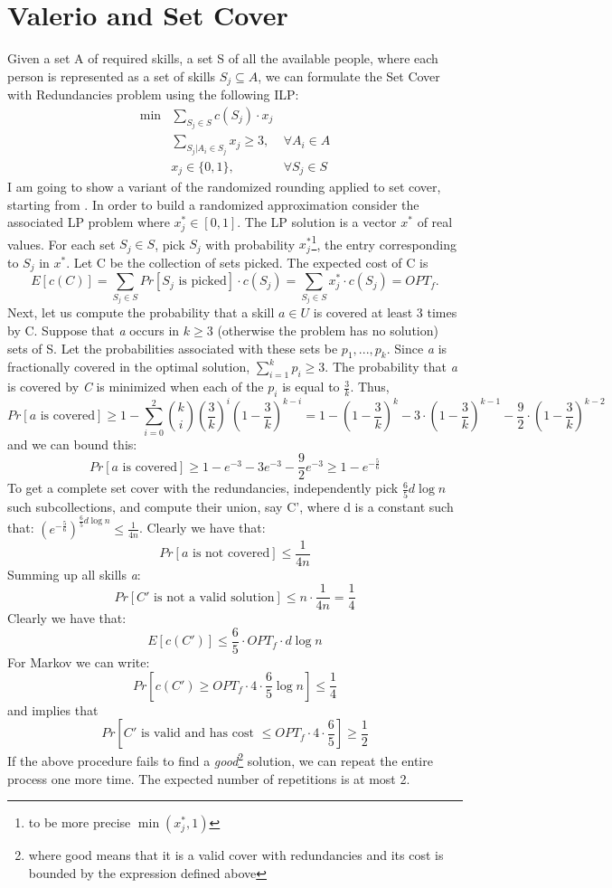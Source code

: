 \section{Valerio and Set Cover}
Given a set A of required skills, a set S of all the available people, where each person is represented as a set of skills $S_j \subseteq A$, we can formulate the Set Cover with Redundancies problem using the following ILP:
\begin{align*}
\min&\sum_{S_j \in S} c(S_j) \cdot x_j \\
&\sum_{S_j | A_i \in S_j} x_j \geq 3, & \forall A_i \in A \\
&x_j \in \{0, 1\}, & \forall S_j \in S
\end{align*}
I am going to show a variant of the randomized rounding applied to set cover, starting from \cite{Vazirani}.
In order to build a randomized approximation consider the associated LP problem where $x^*_j \in [0, 1]$. The LP solution is a vector $x^*$ of real values.
For each set $S_j \in S$, pick $S_j$ with probability $x^*_j$\footnote{to be more precise $\min(x^*_j, 1)$}, the entry corresponding to $S_j$ in $x^*$. Let C be the collection of sets picked. The expected cost of C is
\[
E[c(C)] = \sum_{S_j \in S} Pr[S_j \text{ is picked}] \cdot c(S_j) = \sum_{S_j \in S} x^*_j \cdot c(S_j) = OPT_f.
\]
Next, let us compute the probability that a skill $a \in U$ is covered at least 3 times by C. Suppose that \textit{a} occurs in $k \geq 3$ (otherwise the problem has no solution) sets of S. Let the probabilities associated with these sets be $p_1, ..., p_k.$ Since \textit{a} is fractionally covered in the optimal solution, $\sum_{i=1}^{k} p_i \geq 3.$ The probability that \textit{a} is covered by \textit{C} is minimized when each of the $p_i$ is equal to $\frac{3}{k}.$ Thus,
\[
Pr[a \text{ is covered}] \geq  1 - \sum_{i=0}^{2} \binom{k}{i} (\frac{3}{k})^{i} (1-\frac{3}{k})^{k-i} = 1 - (1-\frac{3}{k})^k - 3 \cdot (1-\frac{3}{k})^{k-1} - \frac{9}{2}\cdot (1-\frac{3}{k})^{k-2}
\]
and we can bound this:
\[
Pr[a \text{ is covered}] \geq 1 - e^{-3} - 3e^{-3} - \frac{9}{2} e^{-3} \geq 1- e^{-\frac{5}{6}}
\]
To get a complete set cover with the redundancies, independently pick $\frac{6}{5}d \log n$ such subcollections, and compute their union, say C', where d is a constant such that:
$({e^{-\frac{5}{6}}})^{\frac{6}{5} d\log n} \leq \frac{1}{4n}$. Clearly we have that:
\[
Pr[a \text{ is not covered}] \leq \frac{1}{4n}
\]
Summing up all skills \textit{a}:
\[
Pr[C' \text{ is not a valid solution}] \leq n \cdot \frac{1}{4n} = \frac{1}{4}
\]
Clearly we have that:
\[
E[c(C')] \leq \frac{6}{5} \cdot OPT_f \cdot d \log n
\]
For Markov we can write:
\[
Pr[c(C') \geq OPT_f \cdot 4\cdot \frac{6}{5} \log n] \leq \frac{1}{4}
\]
and implies that
\[
Pr[C' \text{ is valid and has cost } \leq OPT_f \cdot 4\cdot \frac{6}{5}] \geq \frac{1}{2}
\]
If the above procedure fails to find a \textit{good}\footnote{where good means that it is a valid cover with redundancies and its cost is bounded by the expression defined above} solution, we can repeat the entire process one more time. The expected number of repetitions is at most 2.